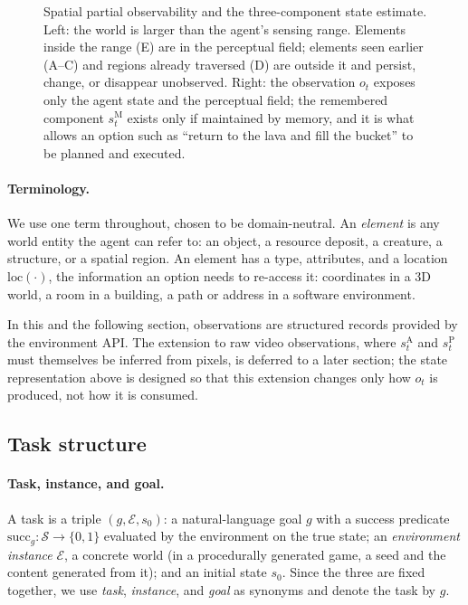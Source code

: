 \documentclass[11pt]{article}
\newcommand{\calS}{\mathcal{S}}
\newcommand{\calE}{\mathcal{E}}
\newcommand{\sA}{s^{\mathrm{A}}}
\newcommand{\sP}{s^{\mathrm{P}}}
\newcommand{\sM}{s^{\mathrm{M}}}
\newcommand{\loc}{\mathrm{loc}}
\begin{document}
\begin{figure}[t]
\centering

\caption{Spatial partial observability and the three-component state estimate. Left: the world is larger than the agent's sensing range. Elements inside the range (E) are in the perceptual field; elements seen earlier (A--C) and regions already traversed (D) are outside it and persist, change, or disappear unobserved. Right: the observation $o_t$ exposes only the agent state and the perceptual field; the remembered component $\sM_t$ exists only if maintained by memory, and it is what allows an option such as ``return to the lava and fill the bucket'' to be planned and executed.}
\label{fig:pomdp}
\end{figure}


\paragraph{Terminology.}
We use one term throughout, chosen to be domain-neutral. An \emph{element} is any world entity the agent can refer to: an object, a resource deposit, a creature, a structure, or a spatial region. An element has a type, attributes, and a location $\loc(\cdot)$, the information an option needs to re-access it: coordinates in a 3D world, a room in a building, a path or address in a software environment.

In this and the following section, observations are structured records provided by the environment API. The extension to raw video observations, where $\sA_t$ and $\sP_t$ must themselves be inferred from pixels, is deferred to a later section; the state representation above is designed so that this extension changes only how $o_t$ is produced, not how it is consumed.

\subsection{Task structure}
\label{sec:tasks}

\paragraph{Task, instance, and goal.}
A task is a triple $(g,\calE,s_0)$: a natural-language goal $g$ with a success predicate $\mathrm{succ}_g:\calS\to\{0,1\}$ evaluated by the environment on the true state; an \emph{environment instance} $\calE$, a concrete world (in a procedurally generated game, a seed and the content generated from it); and an initial state $s_0$. Since the three are fixed together, we use \emph{task}, \emph{instance}, and \emph{goal} as synonyms and denote the task by $g$.
\end{document}
